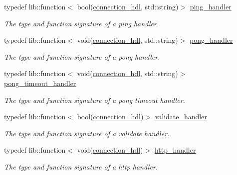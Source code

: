 \begin{DoxyCompactItemize}
typedef lib\+::function$<$ bool(\mbox{\hyperlink{namespacewebsocketpp_a6b3d26a10ee7229b84b776786332631d}{connection\+\_\+hdl}}, std\+::string)$>$ \mbox{\hyperlink{namespacewebsocketpp_a9dcaaa7370865f1bcacb55ae715793ef}{ping\+\_\+handler}}
\begin{DoxyCompactList}\small\item\em The type and function signature of a ping handler. \end{DoxyCompactList}\item 
typedef lib\+::function$<$ void(\mbox{\hyperlink{namespacewebsocketpp_a6b3d26a10ee7229b84b776786332631d}{connection\+\_\+hdl}}, std\+::string)$>$ \mbox{\hyperlink{namespacewebsocketpp_a1798d54e6d98a481cf870091af84bc1f}{pong\+\_\+handler}}
\begin{DoxyCompactList}\small\item\em The type and function signature of a pong handler. \end{DoxyCompactList}\item 
typedef lib\+::function$<$ void(\mbox{\hyperlink{namespacewebsocketpp_a6b3d26a10ee7229b84b776786332631d}{connection\+\_\+hdl}}, std\+::string)$>$ \mbox{\hyperlink{namespacewebsocketpp_a2c5925a111b9e553efebea35d5ea155f}{pong\+\_\+timeout\+\_\+handler}}
\begin{DoxyCompactList}\small\item\em The type and function signature of a pong timeout handler. \end{DoxyCompactList}\item 
typedef lib\+::function$<$ bool(\mbox{\hyperlink{namespacewebsocketpp_a6b3d26a10ee7229b84b776786332631d}{connection\+\_\+hdl}})$>$ \mbox{\hyperlink{namespacewebsocketpp_ae28f3fed86a59b1998746694f3d4edbd}{validate\+\_\+handler}}
\begin{DoxyCompactList}\small\item\em The type and function signature of a validate handler. \end{DoxyCompactList}\item 
typedef lib\+::function$<$ void(\mbox{\hyperlink{namespacewebsocketpp_a6b3d26a10ee7229b84b776786332631d}{connection\+\_\+hdl}})$>$ \mbox{\hyperlink{namespacewebsocketpp_a37bc4d5b3b21d3bb494d8a23236315d2}{http\+\_\+handler}}
\begin{DoxyCompactList}\small\item\em The type and function signature of a http handler. \end{DoxyCompactList}\item 
\mbox{\label{namespacewebsocketpp_a6fb3f66d640c365795dcc01a7f87c900}} 

\end{DoxyCompactItemize}
